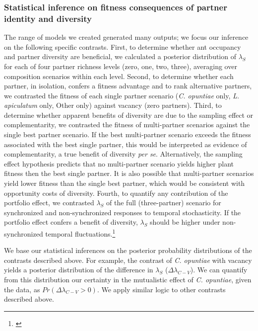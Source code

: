 \documentclass[11pt]{article}
\newcommand{\tom}[2]{{\color{red}{#1}}\footnote{\textit{\color{red}{#2}}}}
\begin{document}
\subsubsection*{Statistical inference on fitness consequences of partner identity and diversity}
The range of models we created generated many outputs; we focus our inference on the following specific contrasts. 
First, to determine whether ant occupancy and partner diversity are beneficial, we calculated a posterior distribution of $\lambda_{S}$ for each of four partner richness levels (zero, one, two, three), averaging over composition scenarios within each level. 
Second, to determine whether each partner, in isolation, confers a fitness advantage and to rank alternative partners, we contrasted the fitness of each single partner scenario (\textit{C. opuntiae} only, \textit{L. apiculatum} only, Other only) against vacancy (zero partners). 
Third, to determine whether apparent benefits of diversity are due to the sampling effect or complementarity, we contrasted the fitness of multi-partner scenarios against the single best partner scenario. 
If the best multi-partner scenario exceeds the fitness associated with the best single partner, this would be interpreted as evidence of complementarity, a true benefit of diversity \emph{per se}. 
Alternatively, the sampling effect hypothesis predicts that no multi-partner scenario yields higher plant fitness then the best single partner. 
It is also possible that multi-partner scenarios yield lower fitness than the single best partner, which would be consistent with opportunity costs of diversity. 
Fourth, to quantify any contribution of the portfolio effect, we contrasted $\lambda_{S}$ of the full (three-partner) scenario for synchronized and non-synchronized responses to temporal stochasticity. 
If the portfolio effect confers a benefit of diversity, $\lambda_{S}$ should be higher under non-synchronized temporal fluctuations.\tom{}{I am actually not sure whether we should look at this as stated, or whether we should compare the difference between all partners and vacancy for synchronous and non-synchronous (which is what I think you currently do.)} 

We base our statistical inferences on the posterior probability distributions of the contrasts described above. 
For example, the contrast of \textit{C. opuntiae} with vacancy yields a posterior distribution of the difference in $\lambda_{S}$ ($\Delta\lambda_{C-V}$). 
We can quantify from this distribution our certainty in the mutualistic effect of \textit{C. opuntiae}, given the data, as $Pr(\Delta\lambda_{C-V}>0)$. 
We apply similar logic to other contrasts described above. 
\end{document}
